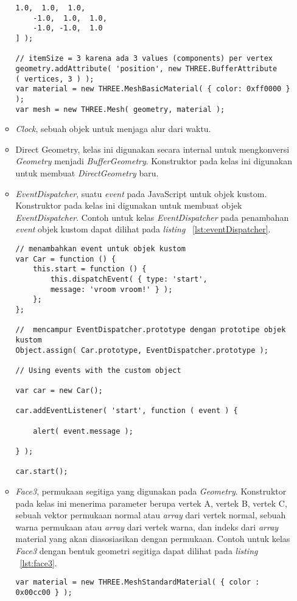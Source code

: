\begin{itemize}
\begin{itemize}
\begin{lstlisting}[caption={Contoh instansiasi kelas {\it BufferGeometry} dengan membuat bentuk kotak sederhana.}, label={lst:bufferGeo},captionpos=b]
	 1.0,  1.0,  1.0,
	-1.0,  1.0,  1.0,
	-1.0, -1.0,  1.0
] );

// itemSize = 3 karena ada 3 values (components) per vertex
geometry.addAttribute( 'position', new THREE.BufferAttribute
( vertices, 3 ) );
var material = new THREE.MeshBasicMaterial( { color: 0xff0000 } );
var mesh = new THREE.Mesh( geometry, material );
\end{lstlisting}
		\item{\it Clock}, sebuah objek untuk menjaga alur dari waktu.
		\item{Direct Geometry}, kelas ini digunakan secara internal untuk mengkonversi {\it Geometry} menjadi {\it BufferGeometry}. Konstruktor pada kelas ini digunakan untuk membuat {\it DirectGeometry} baru.
		\item{\it EventDispatcher}, suatu {\it event} pada JavaScript untuk objek kustom. Konstruktor pada kelas ini digunakan untuk membuat objek {\it EventDispatcher}. Contoh untuk kelas {\it EventDispatcher} pada penambahan {\it event} objek kustom dapat dilihat pada {\it listing} ~\ref{lst:eventDispatcher}.
\begin{lstlisting}[caption={Contoh penggunaan objek {\it EventDispatcher} untuk objek kustom.}, label={lst:eventDispatcher},captionpos=b]
// menambahkan event untuk objek kustom
var Car = function () {
    this.start = function () {
        this.dispatchEvent( { type: 'start',
        message: 'vroom vroom!' } );
    };
};

//  mencampur EventDispatcher.prototype dengan prototipe objek kustom
Object.assign( Car.prototype, EventDispatcher.prototype );

// Using events with the custom object

var car = new Car();

car.addEventListener( 'start', function ( event ) {

    alert( event.message );

} );

car.start();
\end{lstlisting}
		\item{\it Face3}, permukaan segitiga yang digunakan pada {\it Geometry}. Konstruktor pada kelas ini menerima parameter berupa vertek A, vertek B, vertek C, sebuah vektor permukaan normal atau {\it array} dari vertek normal, sebuah warna permukaan atau {\it array} dari vertek warna, dan indeks dari {\it array} material yang akan diasosiasikan dengan permukaan. Contoh untuk kelas {\it Face3} dengan bentuk geometri segitiga dapat dilihat pada {\it listing} ~\ref{lst:face3}.
\begin{lstlisting}[caption={Contoh penggunaan {\it Face3} pada suatu {\it Geometry}.}, label={lst:face3},captionpos=b]
var material = new THREE.MeshStandardMaterial( { color : 0x00cc00 } );


\end{lstlisting}
\end{itemize}
\end{itemize}
